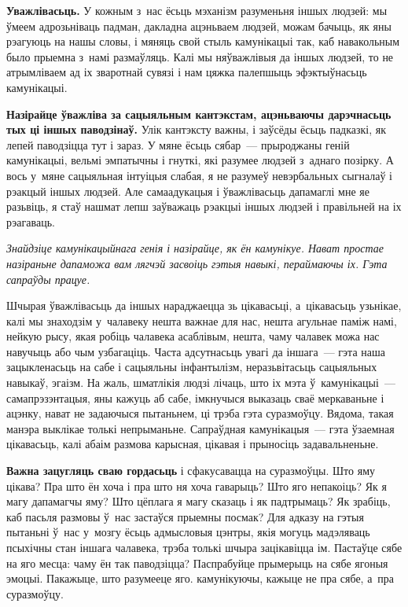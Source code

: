 \textbf{Уважлівасьць.} У кожным з~нас ёсьць мэханізм разуменьня іншых людзей: мы ўмеем адрозьніваць падман, дакладна ацэньваем людзей, можам бачыць, як яны рэагуюць на нашы словы, і мяняць свой стыль камунікацыі так, каб навакольным было прыемна з~намі размаўляць. Калі мы няўважлівыя да іншых людзей, то не атрымліваем ад іх зваротнай сувязі і нам цяжка палепшыць эфэктыўнасьць камунікацыі. 

\textbf{Назірайце ўважліва за сацыяльным кантэкстам, ацэньваючы дарэчнасьць тых ці іншых паводзінаў.} Улік кантэксту важны, і заўсёды ёсьць падказкі, як лепей паводзіцца тут і зараз. У мяне ёсьць сябар~--- прыроджаны геній камунікацыі, вельмі эмпатычны і гнуткі, які разумее людзей з~аднаго позірку. А вось у~мяне сацыяльная інтуіцыя слабая, я не разумеў невэрбальных сыгналаў і рэакцый іншых людзей. Але самаадукацыя і ўважлівасьць дапамаглі мне яе разьвіць, я стаў нашмат лепш заўважаць рэакцыі іншых людзей і правільней на іх рэагаваць.

\emph{Знайдзіце камунікацыйнага генія і назірайце, як ён камунікуе. Нават простае назіраньне дапаможа вам лягчэй засвоіць гэтыя навыкі, пераймаючы іх. Гэта сапраўды працуе.}

Шчырая ўважлівасьць да іншых нараджаецца зь цікавасьці, а~цікавасьць узьнікае, калі мы знаходзім у~чалавеку нешта важнае для нас, нешта агульнае паміж намі, нейкую рысу, якая робіць чалавека асаблівым, нешта, чаму чалавек можа нас навучыць або чым узбагаціць. Часта адсутнасьць увагі да іншага~--- гэта наша зацыкленасьць на сабе і сацыяльны інфантылізм, неразьвітасьць сацыяльных навыкаў, эгаізм. На жаль, шматлікія людзі лічаць, што іх мэта ў~камунікацыі~--- самапрэзэнтацыя, яны кажуць аб сабе, імкнучыся выказаць сваё меркаваньне і ацэнку, нават не задаючыся пытаньнем, ці трэба гэта суразмоўцу. Вядома, такая манэра выклікае толькі непрыманьне. Сапраўдная камунікацыя~--- гэта ўзаемная цікавасьць, калі абаім размова карысная, цікавая і прыносіць задавальненьне.

\textbf{Важна зацугляць сваю гордасьць} і сфакусавацца на суразмоўцы. Што яму цікава? Пра што ён хоча і пра што ня хоча гаварыць? Што яго непакоіць? Як я магу дапамагчы яму? Што цёплага я магу сказаць і як падтрымаць? Як зрабіць, каб пасьля размовы ў~нас застаўся прыемны посмак? Для адказу на гэтыя пытаньні ў~нас у~мозгу ёсьць адмысловыя цэнтры, якія могуць мадэляваць псыхічны стан іншага чалавека, трэба толькі шчыра зацікавіцца ім. Пастаўце сябе на яго месца: чаму ён так паводзіцца? Паспрабуйце прымерыць на сябе ягоныя эмоцыі. Пакажыце, што разумееце яго. камунікуючы, кажыце не пра сябе, а~пра суразмоўцу.

